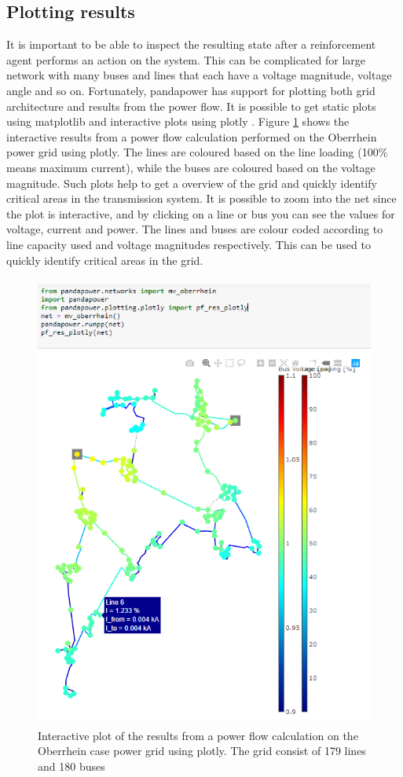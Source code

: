 \documentclass[class=book, crop=false]{standalone}
\begin{document}
\subsection{Plotting results}
It is important to be able to inspect the resulting state after a reinforcement agent performs an action on the system. This can be complicated for large network with many buses and lines that each have a voltage magnitude, voltage angle and so on. Fortunately, pandapower has support for plotting both grid architecture and results from the power flow. It is possible to get static plots using matplotlib and interactive plots using plotly \cite{plotly}. Figure \ref{fig:method:oberrhein_grid_results_plotly} shows the interactive results from a power flow calculation performed on the Oberrhein power grid using plotly. The lines are coloured based on the line loading (100\% means maximum current), while the buses are coloured based on the voltage magnitude. Such plots help to get a overview of the grid and quickly identify critical areas in the transmission system. It is possible to zoom into the net since the plot is interactive, and by clicking on a line or bus you can see the values for voltage, current and power. The lines and buses are colour coded according to line capacity used and voltage magnitudes respectively. This can be used to quickly identify critical areas in the grid.


\begin{figure}[H]
    \center
    \includegraphics[height=15cm, width=12cm]{figures/results_pp_oberrhein.png}
    \caption[size = 9]{Interactive plot of the results from a power flow calculation on the Oberrhein case power grid using plotly. The grid consist of 179 lines and 180 buses}
    \label{fig:method:oberrhein_grid_results_plotly}
\end{figure}
\end{document}
